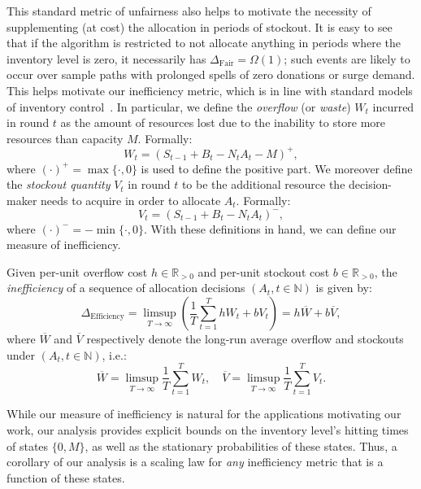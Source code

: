 \documentclass[mnsc,nonblindrev]{informs3}
\newcommand{\N}{\mathbb{N}}
\newcommand{\Deff}{\Delta_{\text{Efficiency}}\xspace}
\newcommand{\Dfair}{\Delta_{\text{Fair}}\xspace}
\begin{document}
This standard metric of unfairness also helps to motivate the necessity of supplementing (at cost) the allocation in periods of stockout. It is easy to see that if the algorithm is restricted to not allocate anything in periods where the inventory level is zero, it necessarily has $\Dfair = \Omega(1)$; such events are likely to occur over sample paths with prolonged spells of zero donations or surge demand.
This helps motivate our inefficiency metric, which is in line with standard models of inventory control~\citep{scarf1957min}.
In particular, we define the {\it overflow} (or {\it waste}) $W_t$ incurred in round $t$ as the amount of resources lost due to the inability to store more resources than capacity $M$. Formally:
\begin{equation}\label{eq:waste}W_t = (S_{t-1} + B_t - N_t A_t - M)^+,
\end{equation}
where $(\cdot)^+ = \max\{\cdot, 0\}$ is used to define the positive part. We moreover define the {\it stockout quantity} $V_t$ in round $t$ to be the additional resource the decision-maker needs to acquire in order to allocate $A_t$. Formally:
\begin{equation}\label{eq:subsidy}V_t = (S_{t-1}+B_t-N_t A_t)^-,\end{equation}
where $(\cdot)^- = -\min\{\cdot, 0\}$.
With these definitions in hand, we can define our measure of inefficiency.
\begin{definition}[Inefficiency]
\label{def:efficiency}
Given per-unit overflow cost $h \in \mathbb{R}_{> 0}$ and per-unit stockout cost $b \in \mathbb{R}_{> 0}$, the \emph{inefficiency} of a sequence of allocation decisions $(A_t, t\in \N)$ is given by:
\begin{equation}
\label{eq:deff}
\Deff = \limsup_{T \rightarrow \infty} \left( \frac{1}{T} \sum_{t=1}^T hW_t + bV_t \right) =  h\overline{W} + b\overline{V},
\end{equation}
where $\overline{W}$ and $\overline{V}$ respectively denote the long-run average overflow and stockouts under $(A_t, t \in \mathbb{N})$, i.e.:
\begin{equation*}
\overline{W} = \limsup_{T \rightarrow \infty} \frac{1}{T} \sum_{t=1}^T W_t, \quad \overline{V} = \limsup_{T \rightarrow \infty} \frac{1}{T} \sum_{t=1}^T V_t.
\end{equation*}
\end{definition}

\begin{remark}
While our measure of inefficiency is natural for the applications motivating our work, our analysis provides explicit bounds on the inventory level's hitting times of states $\{0,M\}$, as well as the stationary probabilities of these states. Thus, a corollary of our analysis is a scaling law for {\it any} inefficiency metric that is a function of these states.
\end{remark}
\end{document}
